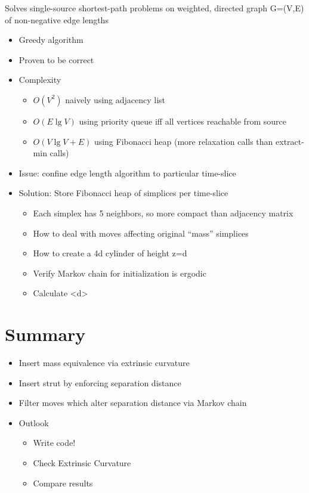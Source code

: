 \documentclass{article}
\begin{document}
Solves single-source shortest-path problems on weighted, directed
graph G=(V,E) of non-negative edge lengths

\begin{itemize}
\item Greedy algorithm
\item Proven to be correct
\item Complexity

\begin{itemize}
\item $O(V^{2})$ naively using adjacency list
\item $O(E\lg V)$ using priority queue iff all vertices reachable from
source
\item $O(V\lg V+E)$ using Fibonacci heap (more relaxation calls than extract-min
calls)
\end{itemize}
\item Issue: confine edge length algorithm to particular time-slice
\item Solution: Store Fibonacci heap of simplices per time-slice

\begin{itemize}
\item Each simplex has 5 neighbors, so more compact than adjacency matrix
\end{itemize}

\begin{itemize}
\item How to deal with moves affecting original ``mass'' simplices
\item How to create a 4d cylinder of height z=d
\item Verify Markov chain for initialization is ergodic
\item Calculate <d>
\end{itemize}
\end{itemize}

\section{Summary}
\begin{itemize}
\item Insert mass equivalence via extrinsic curvature
\item Insert strut by enforcing separation distance
\item Filter moves which alter separation distance via Markov chain
\item Outlook

\begin{itemize}
\item Write code!
\item Check Extrinsic Curvature
\item Compare results
\end{itemize}
\end{itemize}



\end{document}
